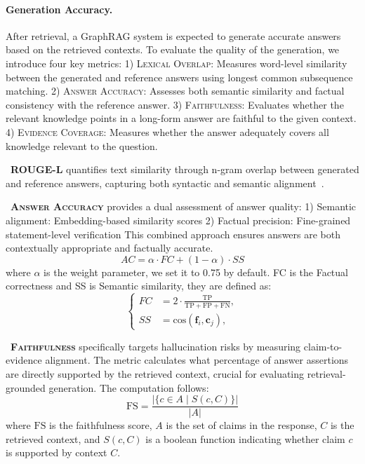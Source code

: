 \documentclass{article} %
\begin{document}
\paragraph{Generation Accuracy.}

After retrieval, a GraphRAG system is expected to generate accurate answers based on the retrieved contexts.  
To evaluate the quality of the generation, we introduce four key metrics:  
1) \textsc{Lexical Overlap}: Measures word-level similarity between the generated and reference answers using longest common subsequence matching.  
2) \textsc{Answer Accuracy}: Assesses both semantic similarity and factual consistency with the reference answer.  
3) \textsc{Faithfulness}: Evaluates whether the relevant knowledge points in a long-form answer are faithful to the given context.  
4) \textsc{Evidence Coverage}: Measures whether the answer adequately covers all knowledge relevant to the question. 

\noindent\textbullet\ \textbf{\textsc{ROUGE-L}} quantifies text similarity through n-gram overlap between generated and reference answers, capturing both syntactic and semantic alignment~\citep{lin2004rouge}.

\noindent\textbullet\ \textbf{\textsc{Answer Accuracy}} provides a dual assessment of answer quality: 1) Semantic alignment: Embedding-based similarity scores
2) Factual precision: Fine-grained statement-level verification
This combined approach ensures answers are both contextually appropriate and factually accurate.
\begin{equation}
    AC = \alpha \cdot FC + (1 - \alpha) \cdot SS
\end{equation}
where $\alpha$ is the weight parameter, we set it to 0.75 by default. FC is the Factual correctness and SS is Semantic similarity, they are defined as:
\begin{equation}
\left\{
\begin{aligned}
FC &= 2 \cdot \frac{\text{TP}}{\text{TP} + \text{FP} + \text{FN}}, \\
SS &= \text{cos}(\textbf{f}_{i}, \textbf{c}_{j}),
\end{aligned}
\right.
\end{equation}

\noindent\textbullet\ \textbf{\textsc{Faithfulness}} specifically targets hallucination risks by measuring claim-to-evidence alignment. The metric calculates what percentage of answer assertions are directly supported by the retrieved context, crucial for evaluating retrieval-grounded generation. The computation follows: 
\begin{equation}
\mathrm{FS} = \frac{|\{ c \in A \mid S(c, C) \}|}{|A|}
\end{equation}
\noindent
where $\mathrm{FS}$ is the faithfulness score, $A$ is the set of claims in the response, $C$ is the retrieved context, and $S(c, C)$ is a boolean function indicating whether claim $c$ is supported by context $C$.
\end{document}
